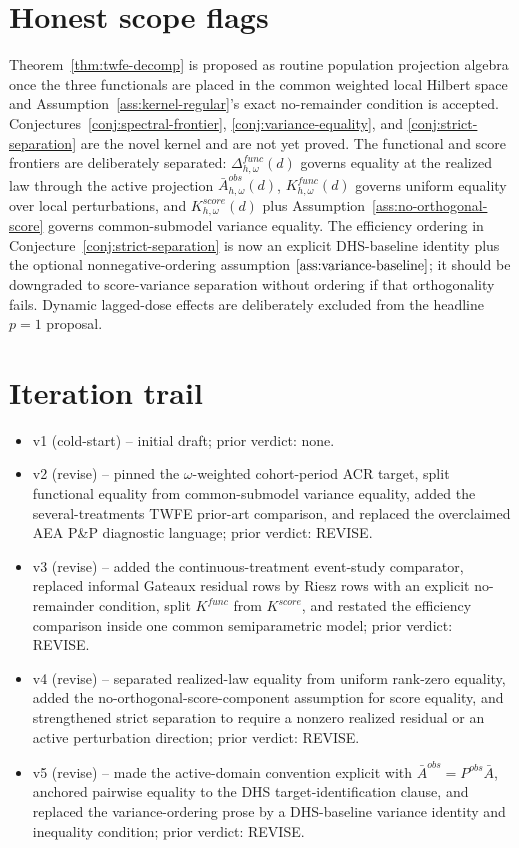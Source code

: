 \documentclass[11pt]{article}
\theoremstyle{definition}
\theoremstyle{plain}
\theoremstyle{remark}
\begin{document}
\section{Honest scope flags}
Theorem~\ref{thm:twfe-decomp} is proposed as routine population projection algebra once the three functionals are placed in the common weighted local Hilbert space and Assumption~\ref{ass:kernel-regular}'s exact no-remainder condition is accepted. Conjectures~\ref{conj:spectral-frontier}, \ref{conj:variance-equality}, and \ref{conj:strict-separation} are the novel kernel and are not yet proved. The functional and score frontiers are deliberately separated: \(\Delta^{func}_{h,\omega}(d)\) governs equality at the realized law through the active projection \(\bar A^{obs}_{h,\omega}(d)\), \(K^{func}_{h,\omega}(d)\) governs uniform equality over local perturbations, and \(K^{score}_{h,\omega}(d)\) plus Assumption~\ref{ass:no-orthogonal-score} governs common-submodel variance equality. The efficiency ordering in Conjecture~\ref{conj:strict-separation} is now an explicit DHS-baseline identity plus the optional nonnegative-ordering assumption \(\ref{ass:variance-baseline}\); it should be downgraded to score-variance separation without ordering if that orthogonality fails. Dynamic lagged-dose effects are deliberately excluded from the headline \(p=1\) proposal.

\section{Iteration trail}
\begin{itemize}
  \item v1 (cold-start) -- initial draft; prior verdict: none.
  \item v2 (revise) -- pinned the \(\omega\)-weighted cohort-period ACR target, split functional equality from common-submodel variance equality, added the several-treatments TWFE prior-art comparison, and replaced the overclaimed AEA P\&P diagnostic language; prior verdict: REVISE.
  \item v3 (revise) -- added the continuous-treatment event-study comparator, replaced informal Gateaux residual rows by Riesz rows with an explicit no-remainder condition, split \(K^{func}\) from \(K^{score}\), and restated the efficiency comparison inside one common semiparametric model; prior verdict: REVISE.
  \item v4 (revise) -- separated realized-law equality from uniform rank-zero equality, added the no-orthogonal-score-component assumption for score equality, and strengthened strict separation to require a nonzero realized residual or an active perturbation direction; prior verdict: REVISE.
  \item v5 (revise) -- made the active-domain convention explicit with \(\bar A^{obs}=P^{obs}\bar A\), anchored pairwise equality to the DHS target-identification clause, and replaced the variance-ordering prose by a DHS-baseline variance identity and inequality condition; prior verdict: REVISE.
\end{itemize}
\end{document}
